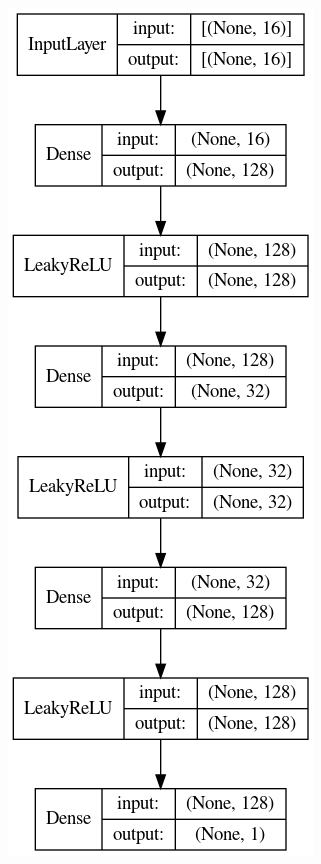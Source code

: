 \begin{figure}
    \centering
    \begin{subfigure}{.5\textwidth}
      \centering
      \includegraphics[width=.5\linewidth]{Plots/model_0fj.png}
    \end{subfigure}%
    \begin{subfigure}{.5\textwidth}
      \centering

\end{subfigure}
\end{figure}
